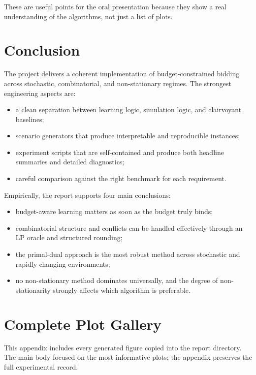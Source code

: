 \documentclass[11pt,a4paper]{article}
\begin{document}
These are useful points for the oral presentation because they show a real
understanding of the algorithms, not just a list of plots.

\section{Conclusion}

The project delivers a coherent implementation of budget-constrained bidding
across stochastic, combinatorial, and non-stationary regimes. The strongest
engineering aspects are:

\begin{itemize}
  \item a clean separation between learning logic, simulation logic, and
  clairvoyant baselines;
  \item scenario generators that produce interpretable and reproducible instances;
  \item experiment scripts that are self-contained and produce both headline
  summaries and detailed diagnostics;
  \item careful comparison against the right benchmark for each requirement.
\end{itemize}

Empirically, the report supports four main conclusions:

\begin{itemize}
  \item budget-aware learning matters as soon as the budget truly binds;
  \item combinatorial structure and conflicts can be handled effectively through
  an LP oracle and structured rounding;
  \item the primal-dual approach is the most robust method across stochastic and
  rapidly changing environments;
  \item no non-stationary method dominates universally, and the degree of
  non-stationarity strongly affects which algorithm is preferable.
\end{itemize}

\appendix

\section{Complete Plot Gallery}

This appendix includes every generated figure copied into the report directory.
The main body focused on the most informative plots; the appendix preserves the
full experimental record.
\end{document}

